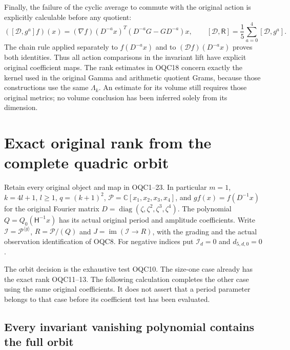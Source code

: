 \documentclass[11pt,a4paper]{article}
\begin{document}
Finally, the failure of the cyclic average to commute with the
original action is explicitly calculable before any quotient:
\[
 ([\mathcal D,g^a]f)(x)
   =(\nabla f)(D^{-a}x)^T
                   (D^{-a}G-GD^{-a})x,
 \qquad
 [\mathcal D,\mathsf R]=\frac15\sum_{a=0}^4[\mathcal D,g^a].
 \tag{OQC23}
\]
The chain rule applied separately to $f(D^{-a}x)$ and to
$(\mathcal Df)(D^{-a}x)$ proves both identities. Thus all
action comparisons in the invariant lift have explicit original
coefficient maps. The rank estimates in OQC18 concern exactly
the kernel used in the original Gamma and arithmetic quotient
Grams, because those constructions use the same $\Lambda_k$.
An estimate for its volume still requires those original metrics;
no volume conclusion has been inferred solely from its dimension.



\section{Exact original rank from the complete quadric orbit}
\label{sec:OQX}

Retain every original object and map in OQC1--23. In particular
$m=1$, $k=4l+1$, $l\geq1$, $q=(k+1)^2$,
$\mathscr P=\mathbb C[x_1,x_2,x_3,x_4]$, and
$g f(x)=f(D^{-1}x)$ for the original Fourier matrix
$D=\operatorname{diag}(\zeta,\zeta^2,\zeta^3,\zeta^4)$.
The polynomial $Q=Q_0(\mathsf H^{-1}x)$ has its actual original
period and amplitude coefficients. Write
$\mathscr I=\mathscr P^{\langle g\rangle}$,
$R=\mathscr P/(Q)$ and $J=\operatorname{im}(\mathscr I\to R)$,
with the grading and the actual observation identification of OQC8.
For negative indices put $\mathscr I_d=0$ and $d_{5,d,0}=0$.

The orbit decision is the exhaustive test OQC10. The size-one
case already has the exact rank OQC11--13. The following calculation
completes the other case using the same original coefficients. It
does not assert that a period parameter belongs to that case before
its coefficient test has been evaluated.

\subsection{Every invariant vanishing polynomial contains the full orbit}
\end{document}
